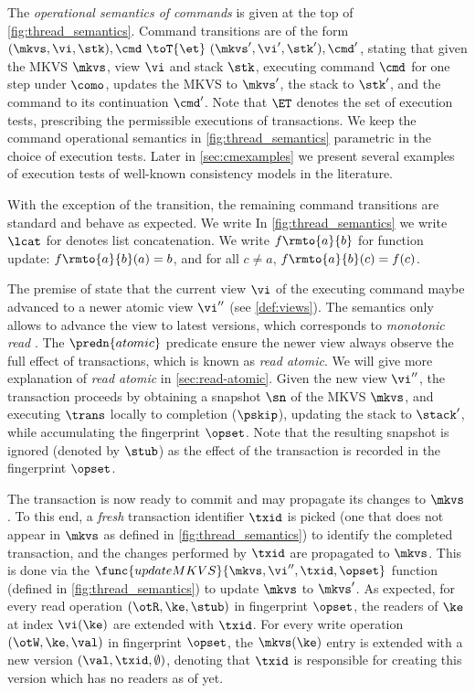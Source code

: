 The \emph{operational semantics of commands} is given at the top of \cref{fig:thread_semantics}. 
Command transitions are of the form $(\mkvs, \vi, \stk), \cmd \ \toT{\et} \ (\mkvs', \vi', \stk') , \cmd'$, stating that given the MKVS $\mkvs$, view $\vi$ and stack $\stk$, executing command $\cmd$ for one step under $\como$, updates the MKVS to $\mkvs'$, the stack to $\stk'$, and the command to its continuation $\cmd'$. 
Note that $\ET$ denotes the set of execution tests, prescribing the permissible executions of transactions. 
We keep the command operational semantics in \cref{fig:thread_semantics} parametric in the choice of execution tests. 
Later in \cref{sec:cmexamples} we present several examples of execution tests of well-known consistency models in the literature. 

With the exception of the  transition, the remaining command transitions are standard and behave as expected. We write 
In \cref{fig:thread_semantics} we write $\lcat$ for denotes list concatenation.
We write $f \rmto{a}{b}$ for function update: $f \rmto{a}{b}(a) = b$, and for all $c \ne a$, $f \rmto{a}{b}(c) = f(c)$.


The premise of  state that the current view $\vi$ of the executing command maybe advanced to a newer atomic view $\vi''$ (see \cref{def:views}). 
The semantics only allows to advance the view to latest versions, which corresponds to \emph{monotonic read} \cite{.......}.
The \( \predn{atomic} \) predicate ensure the newer view always observe the full effect of transactions, which is known as \emph{read atomic}.
We will give more explanation of \emph{read atomic} in \cref{sec:read-atomic}.
Given the new view $\vi''$, the transaction proceeds by obtaining a snapshot $\sn$ of the MKVS $\mkvs$, and executing $\trans$ locally to completion ($\pskip$), updating the stack to $\stack'$, while accumulating the fingerprint $\opset$. Note that the resulting snapshot is ignored (denoted by $\stub$) as the effect of the transaction is recorded in the fingerprint $\opset$. 
%

The transaction is now ready to commit and may propagate its changes to $\mkvs$.
To this end, a \emph{fresh} transaction identifier $\txid$ is picked (\ie one that does not appear in $\mkvs$ as defined in \cref{fig:thread_semantics}) to identify the completed transaction, and the changes performed by $\txid$ are propagated to $\mkvs$. 
This is done via the $\func{updateMKVS}{\mkvs, \vi'', \txid, \opset}$ function (defined in \cref{fig:thread_semantics}) to update $\mkvs$ to  $\mkvs'$. 
As expected, for every read operation $(\otR, \ke, \stub)$ in fingerprint $\opset$, the readers of $\ke$ at index $\vi(\ke)$ are extended with $\txid$.
For every write operation $(\otW, \ke, \val)$ in fingerprint $\opset$, the $\mkvs(\ke)$ entry is extended with a new version $(\val, \txid, \emptyset)$, denoting that $\txid$ is responsible for creating this version which has no readers as of yet. 

